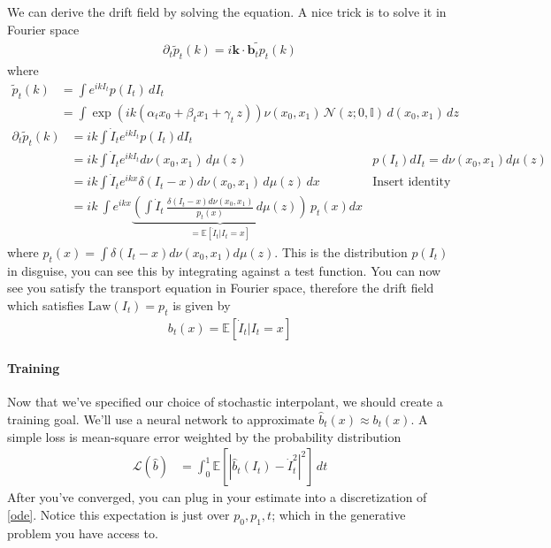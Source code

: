 We can derive the drift field by solving the equation. A nice trick is to solve it in Fourier space
\begin{align}
	\partial_t \tilde p_t(k) =  i \mathbf k \cdot \widetilde{\mathbf{b}_t p_t}(k)
\end{align}
where
\begin{align}
	\tilde p_t(k) & = \int e^{i k I_t} p(I_t)\, dI_t\\
	& = \int \exp\left( ik (\alpha_t x_0  + \beta_t x_1 + \gamma_t \, z)\right) \nu(x_0, x_1) \, \mathcal N(z; 0, \mathbb I) \, d(x_0, x_1) \, dz
\end{align}
\begin{align}
	\partial_t \tilde p_t(k) & = ik \int \dot I_t e^{ik I_t} p(I_t) dI_t\\	
	& = ik \int \dot I_t e^{ik I_t} d\nu(x_0, x_1) \, d\mu(z) & p(I_t) dI_t = d\nu(x_0, x_1) d\mu(z)\\
	& = ik \int  \dot I_t e^{ik x} \delta(I_t - x) d\nu(x_0, x_1) \, d\mu(z) \, dx & \text{Insert identity}\\
	& = ik \ \int e^{ikx} \underbrace{\left(\int \dot I_t \, \frac{\delta(I_t - x) d\nu(x_0, x_1)}{p_t(x)} \, d\mu(z)\right)}_{= \mathbb E[\dot I_t | I_t = x]} \, p_t(x) dx
\end{align}
where $p_t(x) = \int \delta(I_t - x) d\nu(x_0, x_1) d\mu(z)$. This is the distribution $p(I_t)$ in disguise, you can see this by integrating against a test function. You can now see you satisfy the transport equation in Fourier space, therefore the drift field which satisfies $\text{Law}(I_t) = p_t$ is given by
\begin{align}
	\boxed{b_t(x) = \mathbb E[\dot I_t | I_t = x]}
\end{align}

\paragraph{Training}
Now that we've specified our choice of stochastic interpolant, we should create a training goal. We'll use a neural network to approximate $\hat b_t(x) \approx b_t(x)$. A simple loss is mean-square error weighted by the probability distribution
\begin{align}
	\mathcal L(\hat b) & = \int_0^1 \mathbb E[|\hat b_t(I_t) - \dot I_t^2|^2] \, dt
\end{align}
After you've converged, you can plug in your estimate into a discretization of \ref{ode}. Notice this expectation is just over $p_0, p_1, t$; which in the generative problem you have access to.

